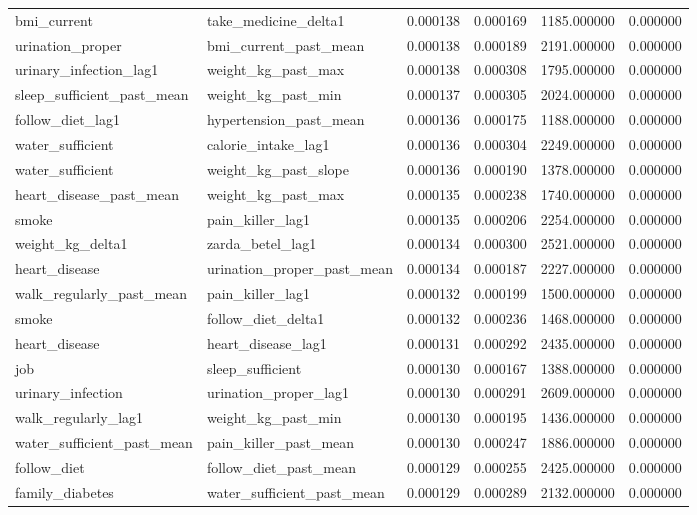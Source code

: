 \begin{longtable}{llrrrr}
bmi\_current & take\_medicine\_delta1 & 0.000138 & 0.000169 & 1185.000000 & 0.000000 \\
urination\_proper & bmi\_current\_past\_mean & 0.000138 & 0.000189 & 2191.000000 & 0.000000 \\
urinary\_infection\_lag1 & weight\_kg\_past\_max & 0.000138 & 0.000308 & 1795.000000 & 0.000000 \\
sleep\_sufficient\_past\_mean & weight\_kg\_past\_min & 0.000137 & 0.000305 & 2024.000000 & 0.000000 \\
follow\_diet\_lag1 & hypertension\_past\_mean & 0.000136 & 0.000175 & 1188.000000 & 0.000000 \\
water\_sufficient & calorie\_intake\_lag1 & 0.000136 & 0.000304 & 2249.000000 & 0.000000 \\
water\_sufficient & weight\_kg\_past\_slope & 0.000136 & 0.000190 & 1378.000000 & 0.000000 \\
heart\_disease\_past\_mean & weight\_kg\_past\_max & 0.000135 & 0.000238 & 1740.000000 & 0.000000 \\
smoke & pain\_killer\_lag1 & 0.000135 & 0.000206 & 2254.000000 & 0.000000 \\
weight\_kg\_delta1 & zarda\_betel\_lag1 & 0.000134 & 0.000300 & 2521.000000 & 0.000000 \\
heart\_disease & urination\_proper\_past\_mean & 0.000134 & 0.000187 & 2227.000000 & 0.000000 \\
walk\_regularly\_past\_mean & pain\_killer\_lag1 & 0.000132 & 0.000199 & 1500.000000 & 0.000000 \\
smoke & follow\_diet\_delta1 & 0.000132 & 0.000236 & 1468.000000 & 0.000000 \\
heart\_disease & heart\_disease\_lag1 & 0.000131 & 0.000292 & 2435.000000 & 0.000000 \\
job & sleep\_sufficient & 0.000130 & 0.000167 & 1388.000000 & 0.000000 \\
urinary\_infection & urination\_proper\_lag1 & 0.000130 & 0.000291 & 2609.000000 & 0.000000 \\
walk\_regularly\_lag1 & weight\_kg\_past\_min & 0.000130 & 0.000195 & 1436.000000 & 0.000000 \\
water\_sufficient\_past\_mean & pain\_killer\_past\_mean & 0.000130 & 0.000247 & 1886.000000 & 0.000000 \\
follow\_diet & follow\_diet\_past\_mean & 0.000129 & 0.000255 & 2425.000000 & 0.000000 \\
family\_diabetes & water\_sufficient\_past\_mean & 0.000129 & 0.000289 & 2132.000000 & 0.000000 \\

\end{longtable}
